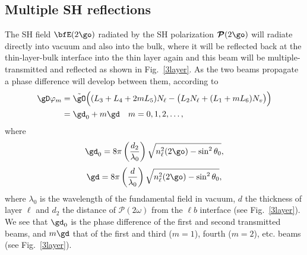 \subsection{Multiple SH reflections}

The SH field $\bfE(2\go)$ radiated by the SH polarization 
$\boldsymbol{\mathcal{P}}(2\go)$
will radiate directly into vacuum and also into the bulk,
where it will be reflected back at the thin-layer-bulk interface into 
the thin layer again and this beam will be multiple-transmitted and 
reflected as shown in Fig.~\ref{3layer}. 
As the two beams propagate a phase difference will develop between
them, according to
\begin{align}\label{m99}
\gD\varphi_m&=\tilde\gO\Big((L_3+L_4+2mL_5)N_\ell
-\big( L_2N_\ell+(L_1+mL_6)N_v\big)
\Big)
\nonumber\\
&=\gd_0 + m\gd\quad m=0,1,2,\ldots
,
\end{align}
where
\begin{align}\label{m97}
\gd_0=8\pi\left(\frac{d_2}{\lambda_0}\right)\sqrt{n^2_\ell(2\go)-\sin^2\theta_0}
,
\end{align}
\begin{align}\label{m96}
\gd=8\pi\left(\frac{d}{\lambda_0}\right)\sqrt{n^2_\ell(2\go)-\sin^2\theta_0}
,
\end{align}
where $\lambda_0$ is the wavelength of the fundamental field in
vacuum, $d$ the thickness of layer $\ell$ and $d_2$ the distance of
$\boldsymbol{\mathcal{P}}(2\omega)$  
from the $\ell b$ interface 
(see Fig.~\ref{3layer}).
We see that
$\gd_0$ is the phase difference of 
the first and second transmitted beams, and $m\gd$ that of the first 
and  third ($m=1$), fourth ($m=2$), etc. beams (see 
Fig.~\ref{3layer}). 

